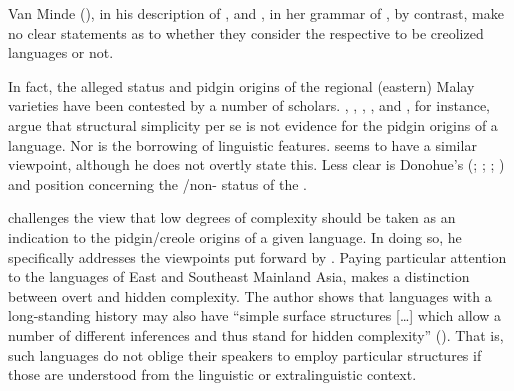 Van Minde (\citeyear*{vanMinde.1997}), in his description of , and \citet{Litamahuputty.1994}, in her grammar of , by contrast, make no clear statements as to whether they consider the respective  to be creolized languages or not.



In fact, the alleged  status and pidgin origins of the regional (eastern) Malay varieties have been contested by a number of scholars. \citet{Collins.1980}, \citet{Wolff.1988}, \citet{Gil.2001}, {\citet{Bisang.2009}}, and {\citet{Paauw.2013}}, for instance, argue that structural simplicity per se is not evidence for the pidgin origins of a language. Nor is the borrowing of linguistic features. {\citet{Blust.2013}} seems to have a similar viewpoint, although he does not overtly state this. Less clear is Donohue's (\citeyear*{Donohue.2003}; \citeyear*{Donohue.2007}; \citeyear*{Donohue.2007b}; \citeyear*{Donohue.2011}) and  position concerning the /non- status of the .



{\citet[35]{Bisang.2009}} challenges the view that low degrees of complexity should be taken as an indication to the pidgin/creole origins of a given language. In doing so, he specifically addresses the viewpoints put forward by \cite{McWhorter.2001, McWhorter.2005}. Paying particular attention to the languages of East and Southeast Mainland Asia, {\citet{Bisang.2009} }makes a distinction between overt and hidden complexity. The author shows that languages with a long-standing history may also have  ``simple surface structures [\ldots] which allow a number of different inferences and thus stand for hidden complexity'' (\citeyear*[35]{Bisang.2009}). That is, such languages do not oblige their speakers to employ particular structures if those are understood from the linguistic or extralinguistic context.



